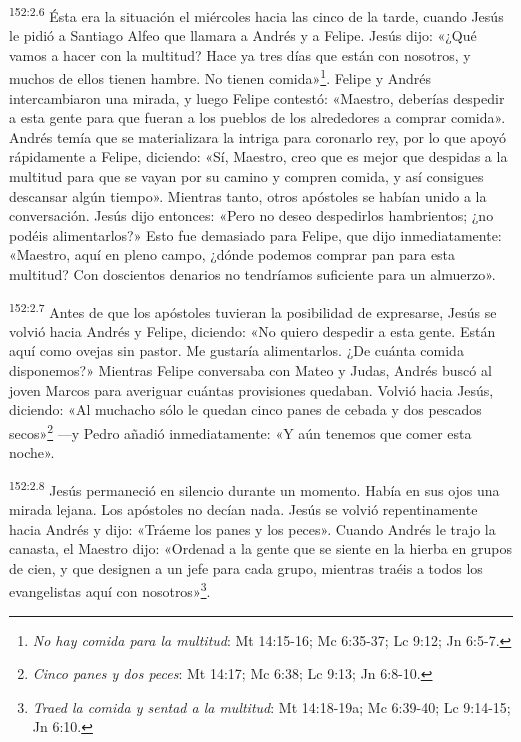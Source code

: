 \par
\textsuperscript{152:2.6} Ésta era la situación el miércoles hacia las cinco de la tarde, cuando Jesús le pidió a Santiago Alfeo que llamara a Andrés y a Felipe. Jesús dijo: «¿Qué vamos a hacer con la multitud? Hace ya tres días que están con nosotros, y muchos de ellos tienen hambre. No tienen comida»\footnote{\textit{No hay comida para la multitud}: Mt 14:15-16; Mc 6:35-37; Lc 9:12; Jn 6:5-7.}. Felipe y Andrés intercambiaron una mirada, y luego Felipe contestó: «Maestro, deberías despedir a esta gente para que fueran a los pueblos de los alrededores a comprar comida». Andrés temía que se materializara la intriga para coronarlo rey, por lo que apoyó rápidamente a Felipe, diciendo: «Sí, Maestro, creo que es mejor que despidas a la multitud para que se vayan por su camino y compren comida, y así consigues descansar algún tiempo». Mientras tanto, otros apóstoles se habían unido a la conversación. Jesús dijo entonces: «Pero no deseo despedirlos hambrientos; ¿no podéis alimentarlos?» Esto fue demasiado para Felipe, que dijo inmediatamente: «Maestro, aquí en pleno campo, ¿dónde podemos comprar pan para esta multitud? Con doscientos denarios no tendríamos suficiente para un almuerzo».

\par
\textsuperscript{152:2.7} Antes de que los apóstoles tuvieran la posibilidad de expresarse, Jesús se volvió hacia Andrés y Felipe, diciendo: «No quiero despedir a esta gente. Están aquí como ovejas sin pastor. Me gustaría alimentarlos. ¿De cuánta comida disponemos?» Mientras Felipe conversaba con Mateo y Judas, Andrés buscó al joven Marcos para averiguar cuántas provisiones quedaban. Volvió hacia Jesús, diciendo: «Al muchacho sólo le quedan cinco panes de cebada y dos pescados secos»\footnote{\textit{Cinco panes y dos peces}: Mt 14:17; Mc 6:38; Lc 9:13; Jn 6:8-10.} ---y Pedro añadió inmediatamente: «Y aún tenemos que comer esta noche».

\par
\textsuperscript{152:2.8} Jesús permaneció en silencio durante un momento. Había en sus ojos una mirada lejana. Los apóstoles no decían nada. Jesús se volvió repentinamente hacia Andrés y dijo: «Tráeme los panes y los peces». Cuando Andrés le trajo la canasta, el Maestro dijo: «Ordenad a la gente que se siente en la hierba en grupos de cien, y que designen a un jefe para cada grupo, mientras traéis a todos los evangelistas aquí con nosotros»\footnote{\textit{Traed la comida y sentad a la multitud}: Mt 14:18-19a; Mc 6:39-40; Lc 9:14-15; Jn 6:10.}.

